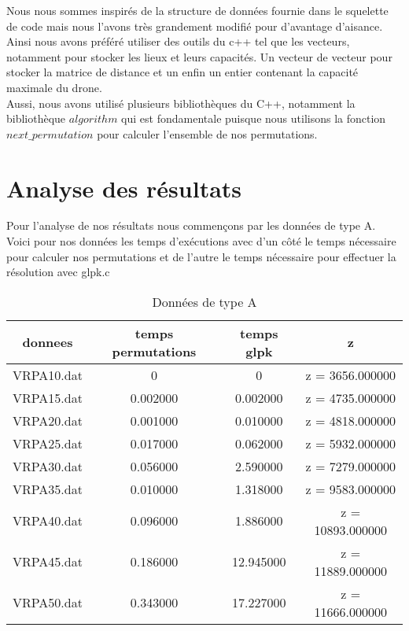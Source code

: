 \documentclass[a4paper,sffamily,12pt]{article}
\begin{document}
			\vspace{0.5cm}

				Nous nous sommes inspirés de la structure de données fournie dans le squelette de code mais nous l'avons très grandement modifié pour d'avantage d'aisance. Ainsi  nous avons préféré utiliser des outils du c++ tel que les vecteurs, notamment pour stocker les lieux et leurs capacités. Un vecteur de vecteur pour stocker la matrice de distance et un enfin un entier contenant la capacité maximale du drone. \\
				\indent Aussi, nous avons utilisé plusieurs bibliothèques du C++, notamment la bibliothèque $algorithm$ qui est fondamentale puisque nous utilisons la fonction $next\_permutation$ pour calculer l'ensemble de nos permutations.
		
		
	\section{Analyse des résultats}
	
		\vspace{0.5cm}		

		Pour l'analyse de nos résultats nous commençons par les données de type A. Voici pour nos données les temps d'exécutions avec d'un côté le temps nécessaire pour calculer nos permutations et de l'autre le temps nécessaire pour effectuer la résolution avec glpk.c\\


		\begin{table}[!h]
		
			\centering
		
			\begin{tabular}{ | c | c | c | c |}
			    	
			    	\hline
			  	donnees  & temps permutations & temps glpk  &  z   \\
			   	\hline
				VRPA10.dat	&	0			&	0		&		z = 3656.000000  \\
			 	\hline
				VRPA15.dat	&	0.002000		&	0.002000	&    		z = 4735.000000\\
			    	\hline
				VRPA20.dat	&	0.001000		&	0.010000	&		z = 4818.000000\\
			    	\hline
				VRPA25.dat	&	0.017000		&	0.062000	&		z = 5932.000000\\
			    	\hline
				VRPA30.dat	&	0.056000		&	2.590000	&		z = 7279.000000  \\
				\hline
				VRPA35.dat	&	0.010000		&	1.318000	&		z = 9583.000000 \\
			   	\hline
				VRPA40.dat	&	0.096000		&	1.886000	&		z = 10893.000000 \\
			   	\hline
			 	VRPA45.dat	&	0.186000		&	12.945000	&		z = 11889.000000  \\
				\hline
				VRPA50.dat	&	0.343000		&	17.227000	&		z = 11666.000000\\
			   	\hline
				
			\end{tabular}
				
			\caption{Données de type A}	
			
		\end{table}
\end{document}
